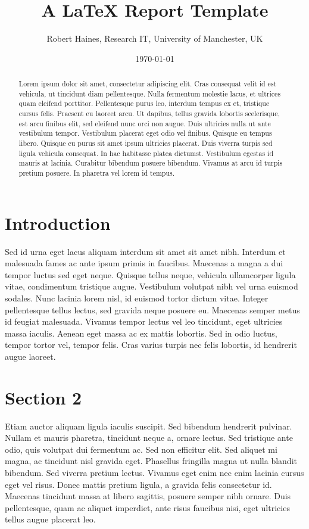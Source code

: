 \documentclass[11pt]{article}
\begin{document}
\title{A {\LaTeX} Report Template}
\author{Robert Haines, Research IT, University of Manchester, UK}
\date{\today}
\maketitle

\begin{abstract}
Lorem ipsum dolor sit amet, consectetur adipiscing elit. Cras consequat velit id est vehicula, ut tincidunt diam pellentesque. Nulla fermentum molestie lacus, et ultrices quam eleifend porttitor. Pellentesque purus leo, interdum tempus ex et, tristique cursus felis. Praesent eu laoreet arcu. Ut dapibus, tellus gravida lobortis scelerisque, est arcu finibus elit, sed eleifend nunc orci non augue. Duis ultricies nulla ut ante vestibulum tempor. Vestibulum placerat eget odio vel finibus. Quisque eu tempus libero. Quisque eu purus sit amet ipsum ultricies placerat. Duis viverra turpis sed ligula vehicula consequat. In hac habitasse platea dictumst. Vestibulum egestas id mauris at lacinia. Curabitur bibendum posuere bibendum. Vivamus at arcu id turpis pretium posuere. In pharetra vel lorem id tempus.
\end{abstract}

\section{Introduction}

Sed id urna eget lacus aliquam interdum sit amet sit amet nibh. Interdum et malesuada fames ac ante ipsum primis in faucibus. Maecenas a magna a dui tempor luctus sed eget neque. Quisque tellus neque, vehicula ullamcorper ligula vitae, condimentum tristique augue. Vestibulum volutpat nibh vel urna euismod sodales. Nunc lacinia lorem nisl, id euismod tortor dictum vitae. Integer pellentesque tellus lectus, sed gravida neque posuere eu. Maecenas semper metus id feugiat malesuada. Vivamus tempor lectus vel leo tincidunt, eget ultricies massa iaculis. Aenean eget massa ac ex mattis lobortis. Sed in odio luctus, tempor tortor vel, tempor felis. Cras varius turpis nec felis lobortis, id hendrerit augue laoreet.

\section{Section 2}

Etiam auctor aliquam ligula iaculis suscipit. Sed bibendum hendrerit pulvinar. Nullam et mauris pharetra, tincidunt neque a, ornare lectus. Sed tristique ante odio, quis volutpat dui fermentum ac. Sed non efficitur elit. Sed aliquet mi magna, ac tincidunt nisl gravida eget. Phasellus fringilla magna ut nulla blandit bibendum. Sed viverra pretium lectus. Vivamus eget enim nec enim lacinia cursus eget vel risus. Donec mattis pretium ligula, a gravida felis consectetur id. Maecenas tincidunt massa at libero sagittis, posuere semper nibh ornare. Duis pellentesque, quam ac aliquet imperdiet, ante risus faucibus nisi, eget ultricies tellus augue placerat leo.
\end{document}
